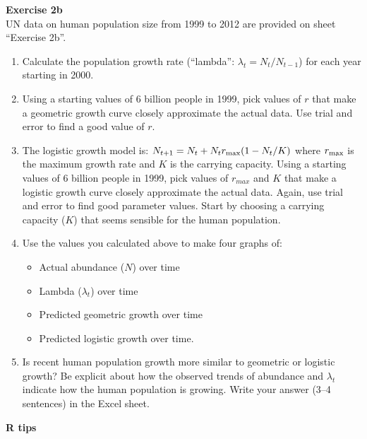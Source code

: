 \documentclass[12pt]{article}\usepackage[]{graphicx}\usepackage[]{xcolor}
\begin{document}
\vspace{24pt}

{\bf Exercise 2b \\}
UN data on human population size from 1999 to 2012 are provided on
sheet ``Exercise 2b''.


\begin{enumerate}
  \item Calculate the population growth rate (``lambda'':
    $\lambda_t = N_{t}/N_{t-1}$) for each year starting in 2000.
  \item Using a starting values of 6 billion people in 1999, pick
    values of $r$ that make a geometric growth curve
    closely approximate the actual data. Use trial and error to find a
    good value of $r$. 
  \item The logistic growth model is: 
    $N_{t+1} = N_t + N_t r_{\rm max}(1 - N_t/K)$ where $r_{\rm max}$
    is the maximum growth rate and $K$ is the carrying capacity.
    Using a starting values of 6 billion people in 1999, pick
    values of $r_{max}$ and $K$ that make a logistic growth curve
    closely approximate the actual data. Again, use trial and error to
    find good parameter values. Start by choosing a carrying capacity
    ($K$) that seems sensible for the human population.  
  \item Use the values you calculated above to make four graphs of:
    \begin{itemize}
      \item Actual abundance ($N$) over time
      \item Lambda ($\lambda_t$) over time
      \item Predicted geometric growth over time
      \item Predicted logistic growth over time.
    \end{itemize}
  \item Is recent human population growth more similar to geometric or
    logistic growth? Be explicit about how the observed trends of
    abundance and $\lambda_t$ indicate how the human population is
    growing. Write your answer (3--4 sentences) in the Excel sheet.
\end{enumerate}



\newpage

{\bf R tips \\}
\end{document}
